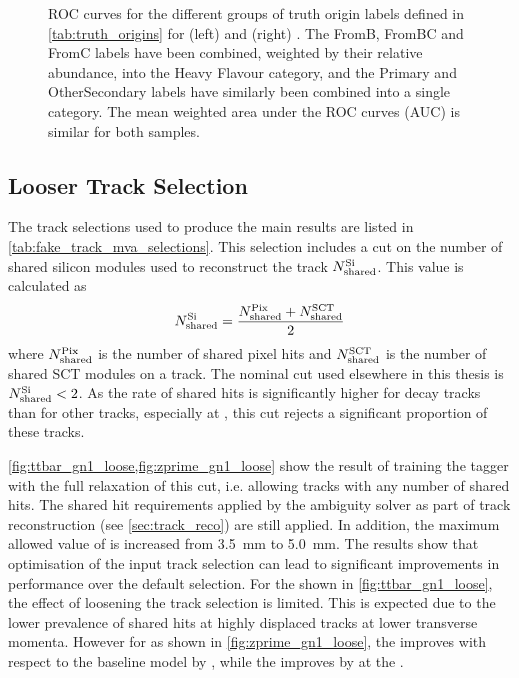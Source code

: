 \begin{figure}[!htbp]
\begin{subfigure}[b]{0.48\textwidth}
    \end{subfigure}
    \caption{
        ROC curves for the different groups of truth origin labels defined in \cref{tab:truth_origins} for \ttbarjets (left) and \Zprimejets (right) \cite{ATL-PHYS-PUB-2022-027}.
        The FromB, FromBC and FromC labels have been combined, weighted by their relative abundance, into the Heavy Flavour category, and the Primary and OtherSecondary labels have similarly been combined into a single category.
        The mean weighted area under the ROC curves (AUC) is similar for both samples.}
    \label{fig:track_origin_roc}
\end{figure}



\subsection{Looser Track Selection}\label{sec:looser_track_selection}

The track selections used to produce the main results are listed in \cref{tab:fake_track_mva_selections}.
This selection includes a cut on the number of shared silicon modules used to reconstruct the track $N^{\textnormal{Si}}_{\textnormal{shared}}$.
This value is calculated as 
%
\begin{equation}
    N^{\textnormal{Si}}_{\textnormal{shared}} = 
    \frac{N^{\textnormal{Pix}}_{\textnormal{shared}} + N^{\textnormal{SCT}}_{\textnormal{shared}}}{2}
\end{equation}
%
where $N^{\textnormal{Pix}}_{\textnormal{shared}}$ is the number of shared pixel hits and $N^{\textnormal{SCT}}_{\textnormal{shared}}$ is the number of shared SCT modules on a track.
The nominal cut used elsewhere in this thesis is $N^{\textnormal{Si}}_{\textnormal{shared}} < 2$.
As the rate of shared hits is significantly higher for \bhadron decay tracks than for other tracks, especially at \highpt, this cut rejects a significant proportion of these tracks.

\cref{fig:ttbar_gn1_loose,fig:zprime_gn1_loose} show the result of training the \GNN tagger with the full relaxation of this cut, i.e. allowing tracks with any number of shared hits.
The shared hit requirements applied by the ambiguity solver as part of track reconstruction (see \cref{sec:track_reco}) are still applied.
In addition, the maximum allowed value of \dzero is increased from \SI{3.5}{\milli\meter} to \SI{5.0}{\milli\meter}.
The results show that optimisation of the input track selection can lead to significant improvements in performance over the default selection.
For the \ttbarjets shown in \cref{fig:ttbar_gn1_loose}, the effect of loosening the track selection is limited.
This is expected due to the lower prevalence of shared hits at highly displaced tracks at lower transverse momenta.
However for \Zprimejets as shown in \cref{fig:zprime_gn1_loose}, the \lrej improves with respect to the baseline \GNN model by , while the \lrej improves by  at the .


